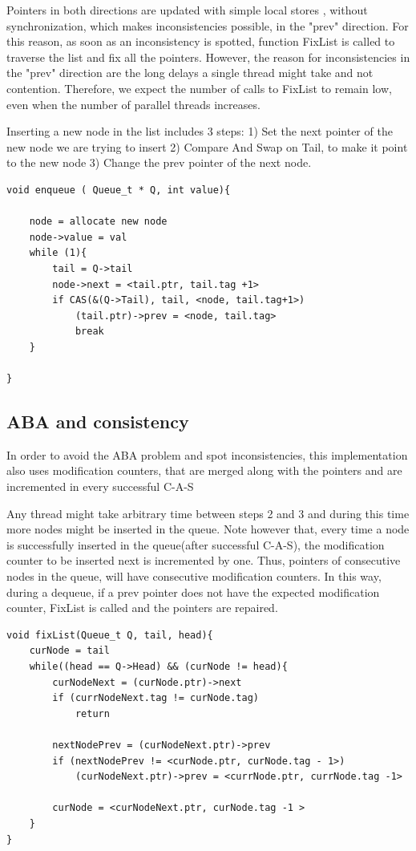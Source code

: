 Pointers in both directions are updated with simple local stores , without synchronization, which makes inconsistencies possible, in the "prev" direction. For this reason, as soon as an inconsistency is spotted, function FixList is called to traverse the list and fix all the pointers. However, the reason for inconsistencies in the "prev" direction are the long delays a single thread might take and not contention. Therefore, we expect the number of calls to FixList to remain low, even when the number of parallel threads increases.

Inserting a new node in the list includes 3 steps:
1) Set the next pointer of the new node we are trying to insert
2) Compare And Swap on Tail, to make it point to the new node
3) Change the prev pointer of the next node.

\begin{lstlisting}
void enqueue ( Queue_t * Q, int value){
	
	node = allocate new node
	node->value = val
	while (1){
		tail = Q->tail
		node->next = <tail.ptr, tail.tag +1>
		if CAS(&(Q->Tail), tail, <node, tail.tag+1>)
			(tail.ptr)->prev = <node, tail.tag>
			break
	}

}

\end{lstlisting}
\subsection{ABA and consistency}

In order to avoid the ABA problem and spot inconsistencies, this implementation also uses modification counters, that are merged along with the pointers and are incremented in every successful C-A-S

Any thread might take arbitrary time  between steps 2 and 3 and during this time more nodes might be inserted in the queue. Note however that, every time a node is successfully inserted in the queue(after successful C-A-S), the modification counter to be inserted next is incremented by one. Thus, pointers of consecutive nodes in the queue, will have consecutive modification counters. In this way, during a dequeue, if a prev pointer does not have the expected modification counter, FixList is called and the pointers are repaired.

\begin{lstlisting}
void fixList(Queue_t Q, tail, head){
	curNode = tail
	while((head == Q->Head) && (curNode != head){
		curNodeNext = (curNode.ptr)->next
		if (currNodeNext.tag != curNode.tag)
			return
		
		nextNodePrev = (curNodeNext.ptr)->prev
		if (nextNodePrev != <curNode.ptr, curNode.tag - 1>)
			(curNodeNext.ptr)->prev = <currNode.ptr, currNode.tag -1>
		
		curNode = <curNodeNext.ptr, curNode.tag -1 >
	}
}
\end{lstlisting}

